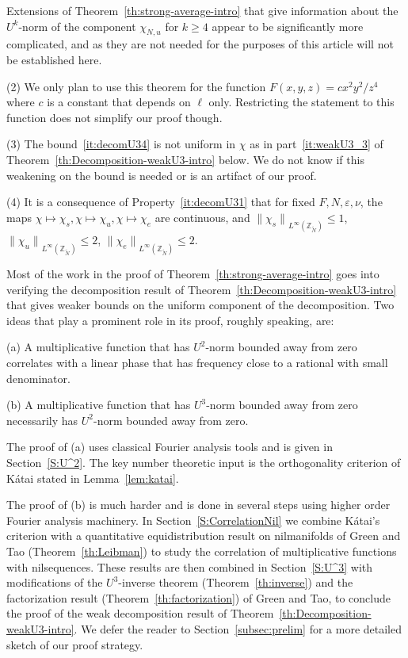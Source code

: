 \documentclass[11pt]{amsart}
\theoremstyle{definition}
\begin{document}
Extensions of Theorem~\ref{th:strong-average-intro}
that give information about the $U^k$-norm of the component $\chi_{N,u}$ for $k\geq 4$
appear to be significantly more complicated, and as they are not needed for the purposes
of this article will not be established here.

(2)
We only plan to use this theorem  for the function $F(x,y,z)=c
x^2y^2/z^4$ where $c$ is a constant that depends on $\ell$ only.
Restricting the statement to this function  does not simplify
our proof though.

(3)
 The bound~\eqref{it:decomU34} is not  uniform in $\chi$ as in part~\eqref{it:weakU3_3}
of Theorem~\ref{th:Decomposition-weakU3-intro} below. We do not know if
this weakening on the bound is needed or is an artifact of our
proof.

(4)
It is a consequence of Property~\eqref{it:decomU31} that for fixed $F,N,  {\varepsilon}, \nu$, the
maps $\chi\mapsto \chi_{s}, \chi\mapsto\chi_{u}, \chi\mapsto
\chi_{e}$ are continuous, and
 ${\lVert {\chi_s} \rVert}_{L^\infty({{{\mathbb Z}}_{\widetilde N}})}\leq 1$,
 ${\lVert {\chi_u} \rVert}_{L^\infty({{{\mathbb Z}}_{\widetilde N}})}\leq 2$,  ${\lVert {\chi_e} \rVert}_{L^\infty({{{\mathbb Z}}_{\widetilde N}})}\leq 2$.

\medskip
Most of the work in the proof of
Theorem~\ref{th:strong-average-intro} goes into verifying the
decomposition result of Theorem~\ref{th:Decomposition-weakU3-intro}
that gives weaker bounds on the uniform component of the
decomposition. Two ideas that play a prominent role in its proof,
roughly speaking, are:

(a)   A multiplicative function that has $U^2$-norm bounded away
from zero correlates with a linear  phase that has frequency close
to a rational with small denominator.

(b)  A multiplicative function that has $U^3$-norm bounded away
from zero necessarily has $U^2$-norm bounded away from zero.

The proof of (a) uses classical  Fourier analysis tools and  is
given in Section~\ref{S:U^2}. The key number theoretic input is the
orthogonality criterion of K\'atai stated in Lemma~\ref{lem:katai}.

  The proof of (b) is much harder and is done in
several steps using higher order Fourier analysis machinery. In
Section~\ref{S:CorrelationNil} we combine K\'atai's criterion with a
quantitative equidistribution result on nilmanifolds  of Green and
Tao (Theorem~\ref{th:Leibman}) to
 study the correlation of multiplicative functions with
 nilsequences. These results  are then combined
 in Section~\ref{S:U^3}
with modifications of  the $U^3$-inverse theorem  (Theorem~\ref{th:inverse}) and
the  factorization result
  (Theorem~\ref{th:factorization}) of Green and Tao, to
conclude the proof of the weak decomposition result of
Theorem~\ref{th:Decomposition-weakU3-intro}. We defer the reader to
Section~\ref{subsec:prelim} for a more detailed sketch of our proof
strategy.
\end{document}
